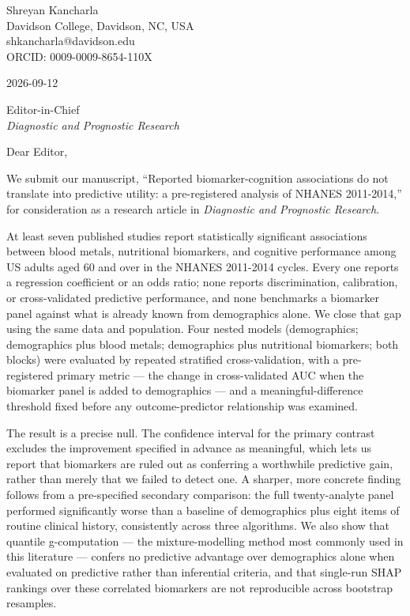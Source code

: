 \documentclass[12pt]{article}
\begin{document}
Shreyan Kancharla \\
Davidson College, Davidson, NC, USA \\
shkancharla@davidson.edu \\
ORCID: 0009-0009-8654-110X

\bigskip

2026-09-12

\bigskip

Editor-in-Chief \\
\textit{Diagnostic and Prognostic Research}

\bigskip

Dear Editor,

We submit our manuscript, ``Reported biomarker-cognition associations do not translate into predictive utility: a pre-registered analysis of NHANES 2011-2014,'' for consideration as a research article in \textit{Diagnostic and Prognostic Research}.

At least seven published studies report statistically significant associations between blood metals, nutritional biomarkers, and cognitive performance among US adults aged 60 and over in the NHANES 2011-2014 cycles. Every one reports a regression coefficient or an odds ratio; none reports discrimination, calibration, or cross-validated predictive performance, and none benchmarks a biomarker panel against what is already known from demographics alone. We close that gap using the same data and population. Four nested models (demographics; demographics plus blood metals; demographics plus nutritional biomarkers; both blocks) were evaluated by repeated stratified cross-validation, with a pre-registered primary metric --- the change in cross-validated AUC when the biomarker panel is added to demographics --- and a meaningful-difference threshold fixed before any outcome-predictor relationship was examined.

The result is a precise null. The confidence interval for the primary contrast excludes the improvement specified in advance as meaningful, which lets us report that biomarkers are ruled out as conferring a worthwhile predictive gain, rather than merely that we failed to detect one. A sharper, more concrete finding follows from a pre-specified secondary comparison: the full twenty-analyte panel performed significantly worse than a baseline of demographics plus eight items of routine clinical history, consistently across three algorithms. We also show that quantile g-computation --- the mixture-modelling method most commonly used in this literature --- confers no predictive advantage over demographics alone when evaluated on predictive rather than inferential criteria, and that single-run SHAP rankings over these correlated biomarkers are not reproducible across bootstrap resamples.
\end{document}

